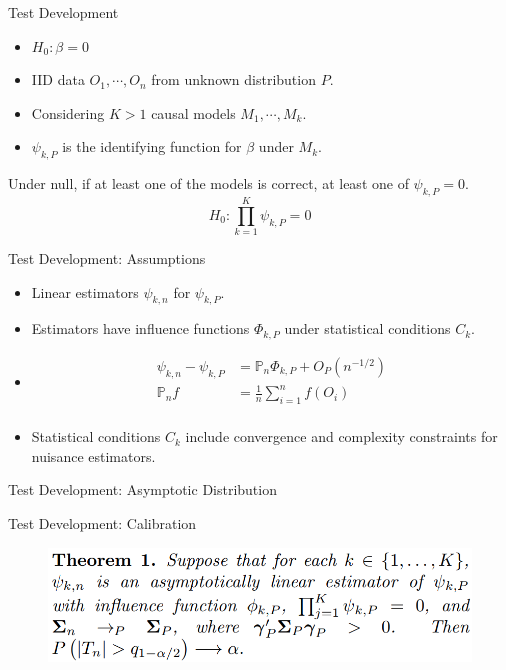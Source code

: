 \documentclass{beamer}
\begin{document}
\begin{frame}{Test Development}
	\begin{itemize}
		\item $H_{0}: \beta = 0 $
		\item IID data $ O_1, \cdots, O_n $ from unknown distribution $ P $.
		\item Considering $ K > 1 $ causal models $ M_1, \cdots, M_k $.
		\item $ \psi_{k, P} $ is the identifying function for $ \beta $ under $ M_k $.
	\end{itemize}

	\vspace{2em}

	Under null, if at least one of the models is correct, at least one of $ \psi_{k, P} = 0 $.
	$$ H_0: \prod_{k=1}^{K} \psi_{k, P} = 0 $$
\end{frame}

\begin{frame}{Test Development: Assumptions}
	\begin{itemize}
		\item Linear estimators $ \psi_{k, n} $ for $ \psi_{k, P} $.
		\item Estimators have influence functions $ \Phi_{k, P} $ under statistical conditions $ C_k $.
		\item \begin{equation*} 
				\begin{split}
					\psi_{k, n} - \psi_{k, P} &= \mathbb{P}_n \Phi_{k, P} + O_{P}(n^{-1/2}) \\
					\mathbb{P}_n f &= \frac{1}{n} \sum_{i=1}^{n} f(O_i) \\
				\end{split}
		      \end{equation*}
		\item Statistical conditions $ C_k$ include convergence and complexity constraints for nuisance estimators.
	\end{itemize}
\end{frame}

\begin{frame}{Test Development: Asymptotic Distribution}
\end{frame}

\begin{frame}{Test Development: Calibration}
	\begin{figure}
		\center
		\includegraphics[scale=0.3]{theorem1.png}
	\end{figure}
\end{frame}
\end{document}
